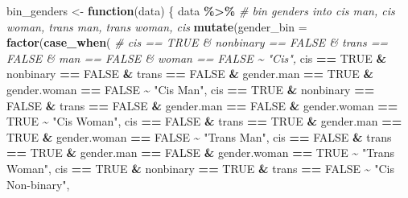 \documentclass[12pt,twoside]{reedthesis}
\newenvironment{Shaded}{\begin{snugshade}}{\end{snugshade}}
\newcommand{\CommentTok}[1]{\textcolor[rgb]{0.56,0.35,0.01}{\textit{#1}}}
\newcommand{\ControlFlowTok}[1]{\textcolor[rgb]{0.13,0.29,0.53}{\textbf{#1}}}
\newcommand{\DataTypeTok}[1]{\textcolor[rgb]{0.13,0.29,0.53}{#1}}
\newcommand{\KeywordTok}[1]{\textcolor[rgb]{0.13,0.29,0.53}{\textbf{#1}}}
\newcommand{\NormalTok}[1]{#1}
\newcommand{\OperatorTok}[1]{\textcolor[rgb]{0.81,0.36,0.00}{\textbf{#1}}}
\newcommand{\OtherTok}[1]{\textcolor[rgb]{0.56,0.35,0.01}{#1}}
\newcommand{\StringTok}[1]{\textcolor[rgb]{0.31,0.60,0.02}{#1}}
\begin{document}
\begin{Shaded}
\begin{Highlighting}[]
\NormalTok{bin\_genders \textless{}{-}}\StringTok{ }\ControlFlowTok{function}\NormalTok{(data) \{}
\NormalTok{  data }\OperatorTok{\%\textgreater{}\%}
\StringTok{    }\CommentTok{\# bin genders into cis man, cis woman, trans man, trans woman, cis }
\StringTok{    }\KeywordTok{mutate}\NormalTok{(}\DataTypeTok{gender\_bin =} \KeywordTok{factor}\NormalTok{(}\KeywordTok{case\_when}\NormalTok{(}
      \CommentTok{\# cis == TRUE \& nonbinary == FALSE \& trans == FALSE \& man == FALSE \& woman == FALSE \textasciitilde{} "Cis",}
\NormalTok{      cis }\OperatorTok{==}\StringTok{ }\OtherTok{TRUE} \OperatorTok{\&}\StringTok{ }\NormalTok{nonbinary }\OperatorTok{==}\StringTok{ }\OtherTok{FALSE} \OperatorTok{\&}\StringTok{ }\NormalTok{trans }\OperatorTok{==}\StringTok{ }\OtherTok{FALSE} \OperatorTok{\&}\StringTok{ }\NormalTok{gender.man }\OperatorTok{==}\StringTok{ }\OtherTok{TRUE} \OperatorTok{\&}\StringTok{ }\NormalTok{gender.woman }\OperatorTok{==}\StringTok{ }\OtherTok{FALSE} \OperatorTok{\textasciitilde{}}\StringTok{ "Cis Man"}\NormalTok{,}
\NormalTok{      cis }\OperatorTok{==}\StringTok{ }\OtherTok{TRUE} \OperatorTok{\&}\StringTok{ }\NormalTok{nonbinary }\OperatorTok{==}\StringTok{ }\OtherTok{FALSE} \OperatorTok{\&}\StringTok{ }\NormalTok{trans }\OperatorTok{==}\StringTok{ }\OtherTok{FALSE} \OperatorTok{\&}\StringTok{ }\NormalTok{gender.man }\OperatorTok{==}\StringTok{ }\OtherTok{FALSE} \OperatorTok{\&}\StringTok{ }\NormalTok{gender.woman }\OperatorTok{==}\StringTok{ }\OtherTok{TRUE} \OperatorTok{\textasciitilde{}}\StringTok{ "Cis Woman"}\NormalTok{,}
\NormalTok{      cis }\OperatorTok{==}\StringTok{ }\OtherTok{FALSE} \OperatorTok{\&}\StringTok{ }\NormalTok{trans }\OperatorTok{==}\StringTok{ }\OtherTok{TRUE} \OperatorTok{\&}\StringTok{ }\NormalTok{gender.man }\OperatorTok{==}\StringTok{ }\OtherTok{TRUE} \OperatorTok{\&}\StringTok{ }\NormalTok{gender.woman }\OperatorTok{==}\StringTok{ }\OtherTok{FALSE} \OperatorTok{\textasciitilde{}}\StringTok{ "Trans Man"}\NormalTok{,}
\NormalTok{      cis }\OperatorTok{==}\StringTok{ }\OtherTok{FALSE} \OperatorTok{\&}\StringTok{ }\NormalTok{trans }\OperatorTok{==}\StringTok{ }\OtherTok{TRUE} \OperatorTok{\&}\StringTok{ }\NormalTok{gender.man }\OperatorTok{==}\StringTok{ }\OtherTok{FALSE} \OperatorTok{\&}\StringTok{ }\NormalTok{gender.woman }\OperatorTok{==}\StringTok{ }\OtherTok{TRUE} \OperatorTok{\textasciitilde{}}\StringTok{ "Trans Woman"}\NormalTok{,}
\NormalTok{      cis }\OperatorTok{==}\StringTok{ }\OtherTok{TRUE} \OperatorTok{\&}\StringTok{ }\NormalTok{nonbinary }\OperatorTok{==}\StringTok{ }\OtherTok{TRUE} \OperatorTok{\&}\StringTok{ }\NormalTok{trans }\OperatorTok{==}\StringTok{ }\OtherTok{FALSE} \OperatorTok{\textasciitilde{}}\StringTok{ "Cis Non{-}binary"}\NormalTok{,}

\end{Highlighting}
\end{Shaded}
\end{document}
